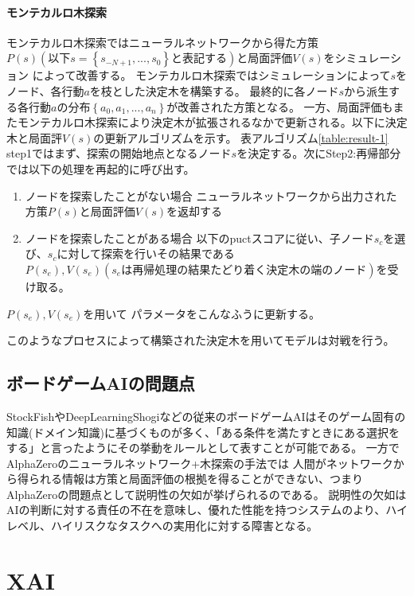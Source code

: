 \paragraph{モンテカルロ木探索}
モンテカルロ木探索ではニューラルネットワークから得た方策$P(s)(以下s=\left\{ s_{-N+1}, ..., s_0 \right\}と表記する)$と局面評価$V(s)$をシミュレーション
によって改善する。
モンテカルロ木探索ではシミュレーションによって$s$をノード、各行動$a$を枝とした決定木を構築する。
最終的に各ノード$s$から派生する各行動$a$の分布$\left\{a_0, a_1, ..., a_n\right\}$が改善された方策となる。
一方、局面評価もまたモンテカルロ木探索により決定木が拡張されるなかで更新される。以下に決定木と局面評$V(s)$の更新アルゴリズムを示す。
表アルゴリズム\ref{table:result-1}
step1ではまず、探索の開始地点となるノード$s$を決定する。次にStep2:再帰部分では以下の処理を再起的に呼び出す。
\begin{enumerate}
	\item ノードを探索したことがない場合
	ニューラルネットワークから出力された方策$P(s)$と局面評価$V(s)$を返却する
	\item ノードを探索したことがある場合
	以下のpuctスコアに従い、子ノード$s_c$を選び、$s_c$に対して探索を行いその結果である$P(s_e), V(s_e)(s_eは再帰処理の結果たどり着く
	決定木の端のノード)$を受け取る。
\end{enumerate}

$P(s_e), V(s_e)$を用いて
パラメータをこんなふうに更新する。

このようなプロセスによって構築された決定木を用いてモデルは対戦を行う。
\subsection{ボードゲームAIの問題点}
StockFish\cite{StockFish}やDeepLearningShogi\cite{dlshogi}などの従来のボードゲームAIはそのゲーム固有の知識(ドメイン知識)に基づくものが多く、「ある条件を満たすときにある選択をする」と言ったようにその挙動をルールとして表すことが可能である。
一方でAlphaZeroのニューラルネットワーク+木探索の手法では
人間がネットワークから得られる情報は方策と局面評価の根拠を得ることができない、つまりAlphaZeroの問題点として説明性の欠如が挙げられるのである。
説明性の欠如はAIの判断に対する責任の不在を意味し、優れた性能を持つシステムのより、ハイレベル、ハイリスクなタスクへの実用化に対する障害となる。



\section{XAI}

